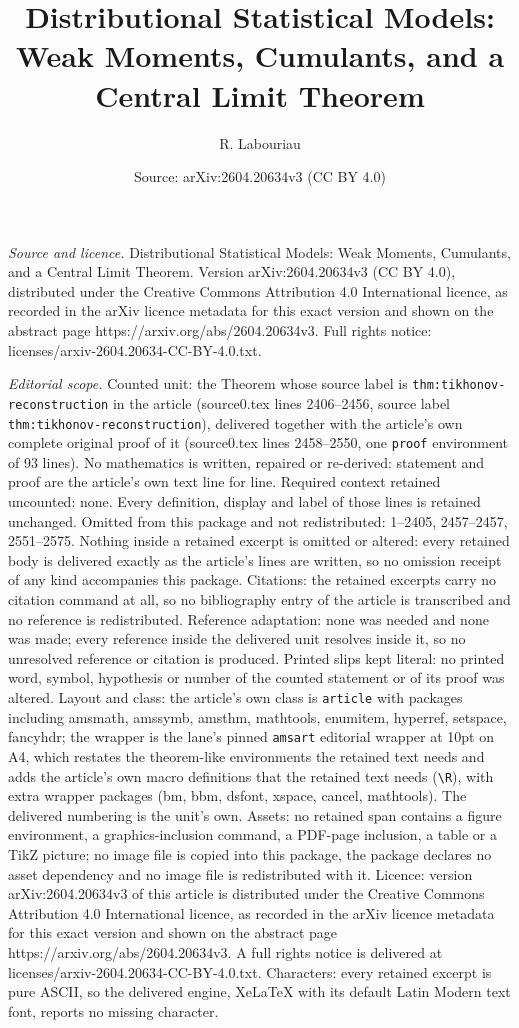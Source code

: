 \documentclass[10pt,a4paper]{amsart}
\title[Distributional Statistical Models: Weak Moments, Cumulants, ]{Distributional Statistical Models: Weak Moments, Cumulants, and a Central Limit Theorem}
\author{R. Labouriau}
\date{Source: arXiv:2604.20634v3 (CC BY 4.0)}
\begin{document}
\maketitle

\noindent\emph{Source and licence.} Distributional Statistical Models: Weak Moments, Cumulants, and a Central Limit Theorem. Version arXiv:2604.20634v3 (CC BY 4.0), distributed under the Creative Commons Attribution 4.0 International licence, as recorded in the arXiv licence metadata for this exact version and shown on the abstract page https://arxiv.org/abs/2604.20634v3. Full rights notice: licenses/arxiv-2604.20634-CC-BY-4.0.txt.\par\smallskip

\noindent\textit{Editorial scope.} Counted unit: the Theorem whose source label is \texttt{thm:tikhonov-reconstruction} in the article (source0.tex lines 2406--2456, source label \texttt{thm:tikhonov-reconstruction}), delivered together with the article's own complete original proof of it (source0.tex lines 2458--2550, one \texttt{proof} environment of 93 lines). No mathematics is written, repaired or re-derived: statement and proof are the article's own text line for line. Required context retained uncounted: none. Every definition, display and label of those lines is retained unchanged. Omitted from this package and not redistributed: 1--2405, 2457--2457, 2551--2575. Nothing inside a retained excerpt is omitted or altered: every retained body is delivered exactly as the article's lines are written, so no omission receipt of any kind accompanies this package. Citations: the retained excerpts carry no citation command at all, so no bibliography entry of the article is transcribed and no reference is redistributed. Reference adaptation: none was needed and none was made; every reference inside the delivered unit resolves inside it, so no unresolved reference or citation is produced. Printed slips kept literal: no printed word, symbol, hypothesis or number of the counted statement or of its proof was altered. Layout and class: the article's own class is \texttt{article} with packages including amsmath, amssymb, amsthm, mathtools, enumitem, hyperref, setspace, fancyhdr; the wrapper is the lane's pinned \texttt{amsart} editorial wrapper at 10pt on A4, which restates the theorem-like environments the retained text needs and adds the article's own macro definitions that the retained text needs (\texttt{\textbackslash R}), with extra wrapper packages (bm, bbm, dsfont, xspace, cancel, mathtools). The delivered numbering is the unit's own. Assets: no retained span contains a figure environment, a graphics-inclusion command, a PDF-page inclusion, a table or a TikZ picture; no image file is copied into this package, the package declares no asset dependency and no image file is redistributed with it. Licence: version arXiv:2604.20634v3 of this article is distributed under the Creative Commons Attribution 4.0 International licence, as recorded in the arXiv licence metadata for this exact version and shown on the abstract page https://arxiv.org/abs/2604.20634v3. A full rights notice is delivered at licenses/arxiv-2604.20634-CC-BY-4.0.txt. Characters: every retained excerpt is pure ASCII, so the delivered engine, XeLaTeX with its default Latin Modern text font, reports no missing character.
\end{document}
